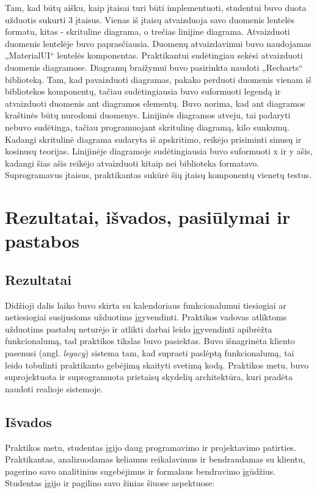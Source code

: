 \documentclass{VUMIFPSbakalaurinis}
\begin{document}
Tam, kad būtų aišku, kaip įtaisai turi būti implementuoti, studentui buvo duota užduotis sukurti 3 įtaisus. Vienas iš įtaisų atvaizduoja savo duomenis lentelės formatu, kitas - skrituline diagrama, o trečias linijine diagrama. Atvaizduoti duomenis lentelėje buvo paprasčiausia. Duomenų atvaizdavimui buvo naudojamas „MaterialUI“ lentelės komponentas. Praktikantui sudėtingiau sekėsi atvaizduoti duomenis diagramose. Diagramų braižymui buvo pasirinkta naudoti „Recharts“ biblioteką. Tam, kad pavaizduoti diagramas, pakako perduoti duomenis vienam iš bibliotekos komponentų, tačiau sudėtingiausia buvo suformuoti legendą ir atvaizduoti duomenis ant diagramos elementų. Buvo norima, kad ant diagramos kraštinės būtų nurodomi duomenys. Linijinės diagramos atveju, tai padaryti nebuvo sudėtinga, tačiau programuojant skritulinę diagramą, kilo sunkumų. Kadangi skritulinė diagrama sudaryta iš apskritimo, reikėjo prisiminti sinusų ir kosinusų teorijas. Linijinėje diagramoje sudėtingiausia buvo suformuoti x ir y ašis, kadangi šias ašis reikėjo atvaizduoti kitaip nei biblioteka formatavo. Suprogramavus įtaisus, praktikantas sukūrė šių įtaisų komponentų vienetų testus.

\section{Rezultatai, išvados, pasiūlymai ir pastabos}

\subsection{Rezultatai}
Didžioji dalis laiko buvo skirta su kalendoriaus funkcionalumui tiesiogiai ar netiesiogiai susijusioms užduotims įgyvendinti. Praktikos vadovas atliktoms užduotims pastabų neturėjo ir atlikti darbai leido įgyvendinti apibrėžta funkcionalumą, tad praktikos tikslas buvo pasiektas. Buvo išnagrinėta kliento pasenusi (angl. \textit{legacy}) sistema tam, kad suprasti paslėptą funkcionalumą, tai leido tobulinti praktikanto gebėjimą skaityti svetimą kodą. Praktikos metu, buvo suprojektuota ir suprogramuota prietaisų skydelių architektūra, kuri pradėta naudoti realioje sistemoje.

\subsection{Išvados}
Praktikos metu, studentas įgijo daug programavimo ir projektavimo patirties. Praktikantas, analizuodamas keliamus reikalavimus ir bendraudamas su klientu, pagerino savo analitinius sugebėjimus ir formalaus bendravimo įgūdžius. Studentas įgijo ir pagilino savo žinias šiuose aspektuose:
\end{document}
